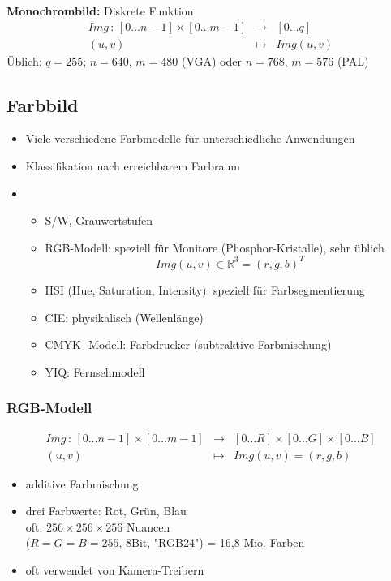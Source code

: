 \textbf{Monochrombild:} Diskrete Funktion
\begin{eqnarray*}
Img \, : \, [0 \dots n-1] \times [0 \dots m-1] &\to& [0 \dots q] \\ (u,v) &\mapsto& Img(u,v)
\end{eqnarray*}
Üblich: $q = 255$; $n = 640$, $m=480$ (VGA) oder $n = 768$, $m=576$ (PAL) \\[0,1cm]
\subsection{Farbbild}
\begin{itemize}
\item Viele verschiedene Farbmodelle für unterschiedliche Anwendungen
\item Klassifikation nach erreichbarem Farbraum
\item
\begin{itemize}
\item S/W, Grauwertstufen
\item RGB-Modell: speziell für Monitore (Phosphor-Kristalle), sehr üblich $$Img(u,v) \in \mathbb{R}^3 = (r,g,b)^T$$
\item HSI (Hue, Saturation, Intensity): speziell für Farbsegmentierung
\item CIE: physikalisch (Wellenlänge)
\item CMYK- Modell: Farbdrucker (subtraktive Farbmischung)
\item YIQ: Fernsehmodell
\end{itemize}
\end{itemize}

\subsubsection{RGB-Modell}

\begin{eqnarray*}
Img \, : \, [0 \dots n-1] \times [0 \dots m-1] &\to& [0 \dots R] \times [0 \dots G] \times [0 \dots B] \\ (u,v) &\mapsto& Img(u,v) = (r,g,b)
\end{eqnarray*}
\begin{itemize}
\item additive Farbmischung
\item drei Farbwerte: Rot, Grün, Blau \\ oft: $256 \times 256 \times 256$ Nuancen \\ ($R=G=B=255$, 8Bit, "{}RGB24"{}) = 16,8 Mio. Farben
\item oft verwendet von Kamera-Treibern
\end{itemize}

